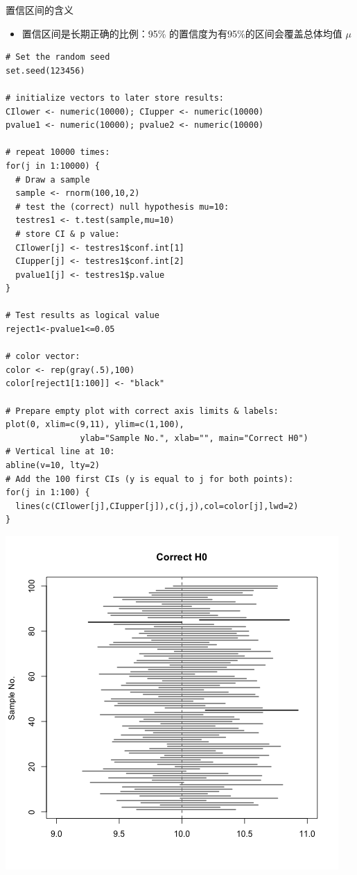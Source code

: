 \documentclass[presentation]{beamer}
\begin{document}
\begin{frame}[fragile,label={sec:org2c8f766}]{置信区间的含义}
 \begin{itemize}
\item 置信区间是长期正确的比例：95\% 的置信度为有95\%的区间会覆盖总体均值 \(\mu\)
\end{itemize}
\begin{verbatim}
# Set the random seed
set.seed(123456)

# initialize vectors to later store results:
CIlower <- numeric(10000); CIupper <- numeric(10000)
pvalue1 <- numeric(10000); pvalue2 <- numeric(10000)

# repeat 10000 times:
for(j in 1:10000) {
  # Draw a sample
  sample <- rnorm(100,10,2)
  # test the (correct) null hypothesis mu=10:
  testres1 <- t.test(sample,mu=10)
  # store CI & p value:
  CIlower[j] <- testres1$conf.int[1]
  CIupper[j] <- testres1$conf.int[2]
  pvalue1[j] <- testres1$p.value
}

# Test results as logical value
reject1<-pvalue1<=0.05

# color vector:
color <- rep(gray(.5),100)
color[reject1[1:100]] <- "black"

# Prepare empty plot with correct axis limits & labels:
plot(0, xlim=c(9,11), ylim=c(1,100), 
		       ylab="Sample No.", xlab="", main="Correct H0")
# Vertical line at 10:
abline(v=10, lty=2)
# Add the 100 first CIs (y is equal to j for both points):
for(j in 1:100) {
  lines(c(CIlower[j],CIupper[j]),c(j,j),col=color[j],lwd=2)
}
\end{verbatim}

\begin{center}
\includegraphics[width=.9\linewidth]{3.png}
\end{center}
\end{frame}
\end{document}
